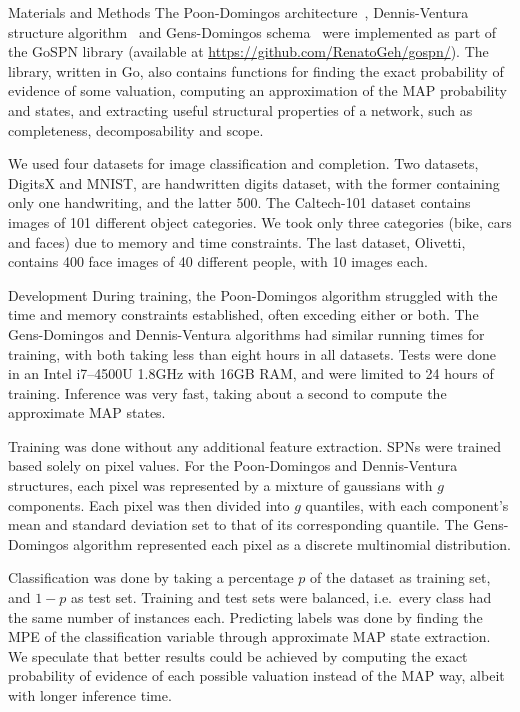 \documentclass[final,hyperref={pdfpagelabels=false},notheorems]{beamer}
\theoremstyle{thesisstyle}
\newcommand{\pskip}{\vskip 0.5cm}
\begin{document}
\begin{frame}[t]
\begin{columns}[t]
\begin{column}{.505\textwidth}
    \begin{block}{Materials and Methods}
      The Poon-Domingos architecture~\cite{poon-domingos}, Dennis-Ventura structure
      algorithm~\cite{clustering} and Gens-Domingos schema~\cite{gens-domingos} were implemented
      as part of the GoSPN library (available at \url{https://github.com/RenatoGeh/gospn/}).  The
      library, written in Go, also contains functions for finding the exact probability of evidence
      of some valuation, computing an approximation of the MAP probability and states, and
      extracting useful structural properties of a network, such as completeness, decomposability
      and scope.\pskip

      We used four datasets for image classification and completion. Two datasets, DigitsX and
      MNIST, are handwritten digits dataset, with the former containing only one handwriting,
      and the latter 500. The Caltech-101 dataset contains images of 101 different object
      categories. We took only three categories (bike, cars and faces) due to memory and time
      constraints. The last dataset, Olivetti, contains 400 face images of 40 different people,
      with 10 images each.
    \end{block}

    \begin{block}{Development}
      During training, the Poon-Domingos algorithm struggled with the time and memory constraints
      established, often exceding either or both. The Gens-Domingos and Dennis-Ventura algorithms
      had similar running times for training, with both taking less than eight hours in all
      datasets. Tests were done in an Intel i7--4500U 1.8GHz with 16GB RAM, and were limited to 24
      hours of training. Inference was very fast, taking about a second to compute the approximate
      MAP states.\pskip

      Training was done without any additional feature extraction. SPNs were trained based solely
      on pixel values. For the Poon-Domingos and Dennis-Ventura structures, each pixel was
      represented by a mixture of gaussians with $g$ components. Each pixel was then divided into
      $g$ quantiles, with each component's mean and standard deviation set to that of its
      corresponding quantile. The Gens-Domingos algorithm represented each pixel as a discrete
      multinomial distribution.\pskip

      Classification was done by taking a percentage $p$ of the dataset as training set, and $1-p$
      as test set. Training and test sets were balanced, i.e.\ every class had the same number of
      instances each. Predicting labels was done by finding the MPE of the classification variable
      through approximate MAP state extraction. We speculate that better results could be achieved
      by computing the exact probability of evidence of each possible valuation instead of the MAP
      way, albeit with longer inference time.\pskip


\end{block}
\end{column}
\end{columns}
\end{frame}
\end{document}
